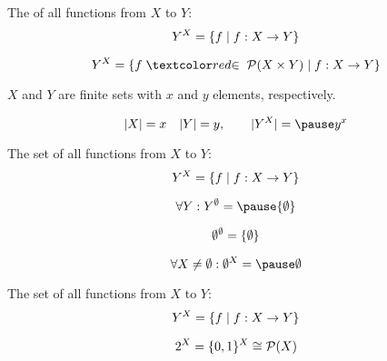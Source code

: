 % 
% 

\begin{frame}
  \begin{definition}
    The  of all functions from $X$ to $Y$:
    \[
      Y^{X} = \{f \mid f: X \to Y\}
    \]
  \end{definition}

  \pause
  \[
    Y^{X} = \set{f \;\red{\in\; \ps{X \times Y}} \mid f: X \to Y}
  \]

  \pause
  \vspace{0.50cm}
  \begin{center}
    $X$ and $Y$ are finite sets with $x$ and $y$ elements, respectively.
  \end{center}
  \[
    |X| = x \quad |Y| = y, \qquad |Y^{X}| = \pause y^{x}
  \]
\end{frame}

\begin{frame}
  \begin{definition}
    The set of all functions from $X$ to $Y$:
    \[
      Y^{X} = \{f \mid f: X \to Y\}
    \]
  \end{definition}

  \[
    \forall Y: Y^{\emptyset} = \pause \set{\emptyset}
  \]

  \pause
  \vspace{-0.30cm}
  \[
    \emptyset^{\emptyset} = \{\emptyset\}
  \]

  \pause
  \[
    \forall X \neq \emptyset: \emptyset^{X} = \pause \emptyset
  \]
\end{frame}

\begin{frame}
  \begin{definition}
    The set of all functions from $X$ to $Y$:
    \[
      Y^{X} = \{f \mid f: X \to Y\}
    \]
  \end{definition}

  \[
    2^{X} = \{0, 1\}^{X} \cong \mathcal{P}(X)
  \]

  \pause
\end{frame}

